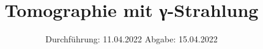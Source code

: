 

\subject{V14}
\title{Tomographie mit γ-Strahlung}
\date{%
  Durchführung: 11.04.2022
  \hspace{3em}
  Abgabe: 15.04.2022
}



\maketitle
\thispagestyle{empty}
\tableofcontents
\newpage





\nocite{*}
\printbibliography{}


